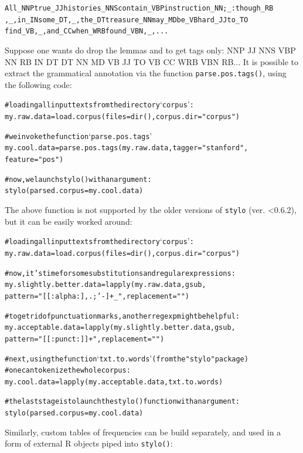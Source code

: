 \documentclass[11pt,a4paper]{article}
\def\code#1{{\tt #1}}
\begin{document}
\begin{alltt}
    All_NNP true_JJ histories_NNS contain_VBP instruction_NN ;_: though_RB 
    ,_, in_IN some_DT ,_, the_DT treasure_NN may_MD be_VB hard_JJ to_TO 
    find_VB ,_, and_CC when_WRB found_VBN ,_, ...
\end{alltt}

Suppose one wants do drop the lemmas and to get tags only: NNP JJ NNS VBP 
NN RB IN DT DT NN MD VB JJ TO VB CC WRB VBN RB... It is possible to 
extract the grammatical annotation via the function \code{parse.pos.tags()},
using the following code:

\begin{alltt}
    # loading all input texts from the directory `corpus':
    my.raw.data = load.corpus(files = dir(), corpus.dir = "corpus")
    
    # we invoke the function `parse.pos.tags'
    my.cool.data = parse.pos.tags(my.raw.data, tagger = "stanford", 
          feature = "pos")

    # now, we launch stylo() with an argument:
    stylo(parsed.corpus = my.cool.data)
\end{alltt}

The above function is not supported by the older versions of \code{stylo}
(ver. <0.6.2), but it can be easily worked around:

\begin{alltt}
    # loading all input texts from the directory `corpus':
    my.raw.data = load.corpus(files = dir(), corpus.dir = "corpus")

    # now, it's time for some substitutions and regular expressions:
    my.slightly.better.data = lapply(my.raw.data, gsub, 
              pattern = "[[:alpha:],.;'-]+_", replacement="")
    
    # to get rid of punctuation marks, another regexp might be helpful:
    my.acceptable.data = lapply(my.slightly.better.data, gsub,
              pattern = "[[:punct:]]+", replacement = "")
    
    # next, using the function `txt.to.words' (from the "stylo" package)
    # one can tokenize the whole corpus:
    my.cool.data = lapply(my.acceptable.data, txt.to.words)

    # the last stage is to launch the stylo() function with an argument:
    stylo(parsed.corpus = my.cool.data)
\end{alltt}

Similarly, custom tables of frequencies can be build separately, and used 
in a form of external R objects piped into \code{stylo()}:
\end{document}
